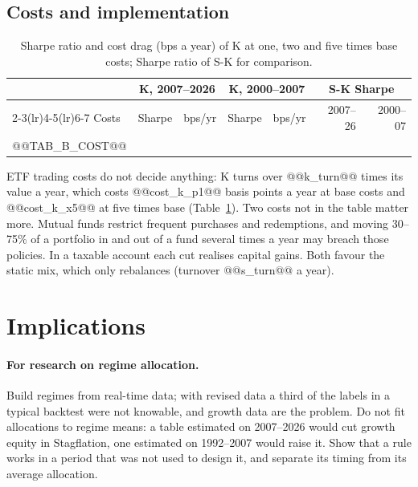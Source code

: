 \documentclass[11pt,a4paper]{article}
\begin{document}
\subsection{Costs and implementation}

\begin{table}[htbp]
\centering
\caption{Sharpe ratio and cost drag (bps a year) of K at one, two and five times base costs; Sharpe ratio of S-K
for comparison.}
\label{tab:cost}
\small
\begin{tabular}{@{}lrrrrrr@{}}
\toprule
& \multicolumn{2}{c}{K, 2007--2026} & \multicolumn{2}{c}{K, 2000--2007} & \multicolumn{2}{c}{S-K Sharpe} \\
\cmidrule(lr){2-3}\cmidrule(lr){4-5}\cmidrule(lr){6-7}
Costs & Sharpe & bps/yr & Sharpe & bps/yr & 2007--26 & 2000--07 \\
\midrule
@@TAB_B_COST@@
\bottomrule
\end{tabular}
\end{table}

ETF trading costs do not decide anything: K turns over @@k_turn@@ times its value a year, which costs @@cost_k_p1@@
basis points a year at base costs and @@cost_k_x5@@ at five times base (Table~\ref{tab:cost}). Two costs not in
the table matter more. Mutual funds restrict frequent purchases and redemptions, and moving 30--75\% of a
portfolio in and out of a fund several times a year may breach those policies. In a taxable account each cut
realises capital gains. Both favour the static mix, which only rebalances (turnover @@s_turn@@ a year).

\section{Implications}

\paragraph{For research on regime allocation.} Build regimes from real-time data; with revised data a third of
the labels in a typical backtest were not knowable, and growth data are the problem. Do not fit allocations to
regime means: a table estimated on 2007--2026 would cut growth equity in Stagflation, one estimated on 1992--2007
would raise it. Show that a rule works in a period that was not used to design it, and separate its timing from
its average allocation.
\end{document}
